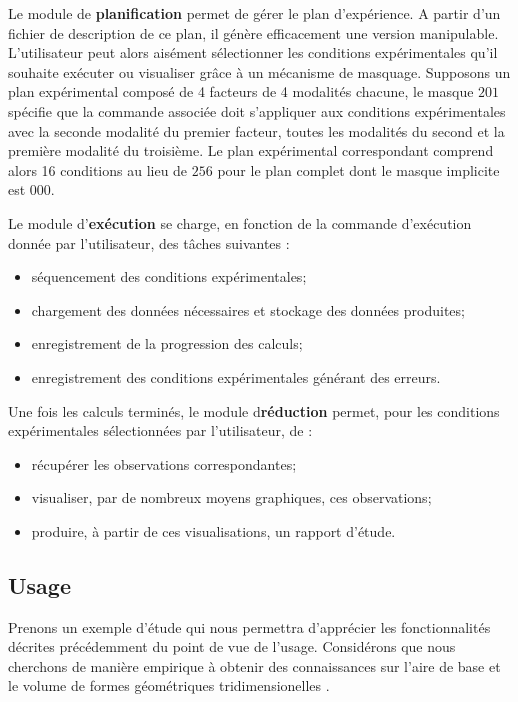 Le module de \textbf{planification} permet de gérer le plan d'expérience. A partir d'un fichier de description de ce plan, il génère efficacement une version manipulable. L'utilisateur peut alors aisément sélectionner les conditions expérimentales qu'il souhaite exécuter ou visualiser grâce à un mécanisme de masquage. Supposons un plan expérimental composé de 4 facteurs de 4 modalités chacune, le masque ${2 0 1}$ spécifie que la commande associée doit s'appliquer aux conditions expérimentales avec la seconde modalité du premier facteur, toutes les modalités du second et la première modalité du troisième. Le plan expérimental correspondant comprend alors 16 conditions au lieu de  $256$ pour le plan complet dont le masque implicite est ${0 0 0}$.

Le module d'\textbf{exécution} se charge, en fonction de la commande d'exécution donnée par l'utilisateur, des tâches suivantes :
\begin{itemize}
  \item séquencement des conditions expérimentales;
  \item chargement des données nécessaires et stockage des données produites;
  \item enregistrement de la progression des calculs;
  \item enregistrement des conditions expérimentales générant des erreurs.
\end{itemize}

Une fois les calculs terminés, le module d\textbf{réduction} permet, pour les conditions expérimentales sélectionnées par l'utilisateur, de :
\begin{itemize}
  \item récupérer les observations correspondantes;
  \item visualiser, par de nombreux moyens graphiques, ces observations;
  \item produire, à partir de ces visualisations, un rapport d'étude.
\end{itemize}

\subsection{\nmu Usage}

Prenons un exemple d'étude qui nous permettra d'apprécier les fonctionnalités décrites précédemment du point de vue de l'usage. Considérons que nous cherchons de manière empirique à obtenir des connaissances sur l'aire de base et le volume de formes géométriques tridimensionelles .

